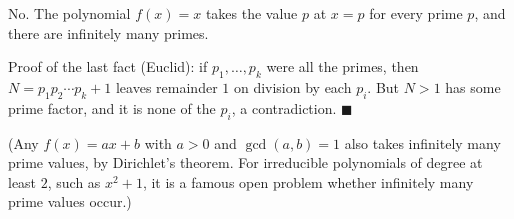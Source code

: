 No. The polynomial $f(x)=x$ takes the value $p$ at $x=p$ for every prime $p$, and there are infinitely many primes.

Proof of the last fact (Euclid): if $p_1,\dots,p_k$ were all the primes, then $N=p_1p_2\cdots p_k+1$ leaves remainder $1$ on division by each $p_i$. But $N>1$ has some prime factor, and it is none of the $p_i$, a contradiction. $\blacksquare$

(Any $f(x)=ax+b$ with $a>0$ and $\gcd(a,b)=1$ also takes infinitely many prime values, by Dirichlet's theorem. For irreducible polynomials of degree at least $2$, such as $x^2+1$, it is a famous open problem whether infinitely many prime values occur.)
